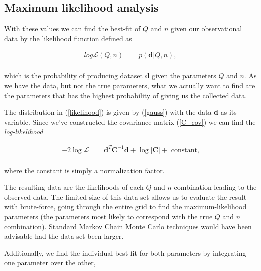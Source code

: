 \documentclass{emulateapj}
\begin{document}
\subsection{Maximum likelihood analysis} 
 
With these values we can find the best-fit of $Q$ and $n$ given our observational data by the likelihood function defined as 

\begin{equation}
\label{likelihood}
\begin{array}{rl}
log\mathcal{L}(Q,n) &= p(\textbf{d}|Q,n),  \\ 
\end{array}
\end{equation}

\noindent
which is the probability of producing dataset \textbf{d} given the parameters $Q$ and $n$. 
As we have the data, but not the true parameters, what we actually want to find are the parameters that has the highest probability of giving us the collected data.  

The distribution in (\ref{likelihood}) is given by (\ref{gauss}) with the data \textbf{d} as its variable. Since we've constructed the covariance matrix (\ref{C_cov}) we can find the \textit{log-likelihood} 

 
\begin{equation}
\label{lnL}
\begin{array}{rl}
-2\log\mathcal{L} &= \textbf{d}^T\textbf{C}^{-1}\textbf{d} + \log|\textbf{C}| + \text{ constant,}  \\ 
\end{array}
\end{equation}

\noindent 
where the constant is simply a normalization factor.

The resulting data are the likelihoods of each $Q$ and $n$ combination leading to the observed data. The limited size of this data set allows us to evaluate the result with brute-force, going through the entire grid to find the maximum-likelihood parameters (the parameters most likely to correspond with the true $Q$ and $n$ combination). Standard Markov Chain Monte Carlo techniques would have been advisable had the data set been larger.

Additionally, we find the individual best-fit for both parameters by integrating one parameter over the other,
\end{document}
